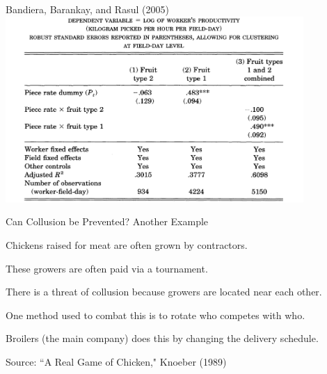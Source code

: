 \documentclass[aspectratio=169,usenames,dvipsnames]{beamer}
\newenvironment{wideitemize}{\itemize\addtolength{\itemsep}{10pt}}{\enditemize}
\begin{document}
\begin{frame}[c]{Bandiera, Barankay, and Rasul (2005)}
\centering
\includegraphics[width=0.85\textwidth]{pictures/switched_fruittype_tournaments.png}

    
\end{frame}

\begin{frame}{Can Collusion be Prevented? Another Example}
\begin{wideitemize}
    \item Chickens raised for meat are often grown by contractors.
    \item These growers are often paid via a tournament.
    \item There is a threat of collusion because growers are located near each other.
    \item One method used to combat this is to rotate who competes with who.
    \item Broilers (the main company) does this by changing the delivery schedule.
\end{wideitemize}

\hfill Source: ``A Real Game of Chicken," Knoeber (1989)
\end{frame}
\end{document}
